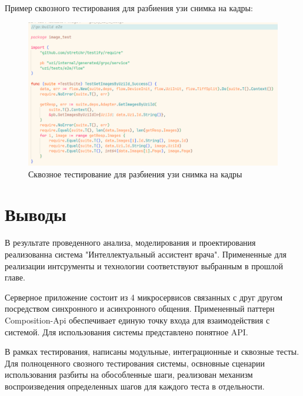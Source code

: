 Пример сквозного тестирования для разбиения узи снимка на кадры:
\begin{figure}[H]%
	\begin{center}
		\includegraphics[width=.7\columnwidth]{./img/new/e2e_test.png}%
	\end{center}
	\caption{Сквозное тестирование для разбиения узи снимка на кадры}%
	\label{pic:e2e_test}%
\end{figure}


\section{Выводы}
В результате проведенного анализа, моделирования и проектирования реализованна система "Интеллектуальный ассистент врача". 
Примененные для реализации интсрументы и технологии соответствуют выбранным в прошлой главе.


Серверное приложение состоит из 4 микросервисов связанных с друг другом посредством синхронного и асинхронного общения. Примененный паттерн Composition-Api 
обеспечивает единую точку входа для взаимодействия с системой. Для использования системы представлено понятное API.


В рамках тестирования, написаны модульные, интеграционные и сквозные тесты. Для полноценного свозного тестирования системы, освновные сценарии использования
разбиты на обособленные шаги, реализован механизм воспроизведения определенных шагов для каждого теста в отдельности. 

